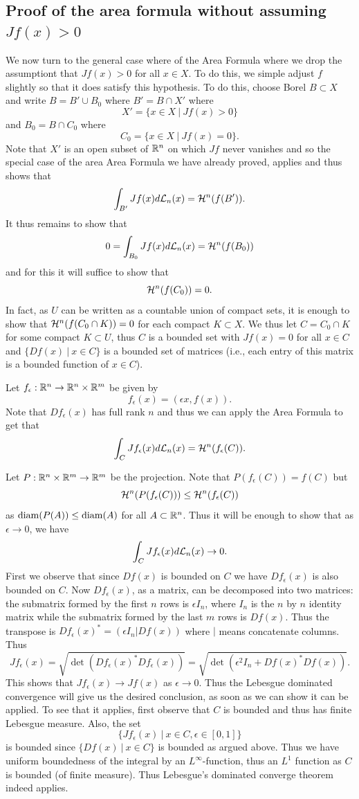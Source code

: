 \documentclass[twoside, a4paper, 10pt]{amsart}
\begin{document}
\subsection{Proof of the area formula without assuming $Jf(x)>0$} We now turn to the general case where of the Area Formula where we drop the assumptiont that $Jf(x)>0$ for all $x \in X$. To do this, we simple adjust $f$ slightly so that it does satisfy this hypothesis. To do this, choose Borel $B \subset X$ and write $B = B' \cup B_0$ where $B' = B \cap X'$ where $$X' = \{ x \in X ~|~ Jf(x) > 0 \}$$ and $B_0 = B \cap C_0$ where 
$$ C_0 = \{ x \in X ~|~ Jf(x) = 0 \}.$$ Note that $X'$ is an open subset of $\mathbb{R}^n$ on which $Jf$ never vanishes and so the special case of the area Area Formula we have already proved, applies and thus shows that $$\int_{B'} Jf(x) d\mathcal{L}_n(x) = \mathcal{H}^n(f(B')).$$ It thus remains to show that 
$$0 = \int_{B_0} Jf(x) d\mathcal{L}_n(x) = \mathcal{H}^n(f(B_0))$$ and for this it will suffice to show that $$\mathcal{H}^n(f(C_0)) = 0.$$ In fact, as $U$ can be written as a countable union of compact sets, it is enough to show that $\mathcal{H}^n(f(C_0 \cap K)) = 0$ for each compact $K \subset X$. We thus let $C = C_0 \cap K$ for some compact $K \subset U$, thus $C$ is a bounded set with $Jf(x) = 0$ for all $x \in C$ and $\{ Df(x) ~|~ x \in C\}$ is a bounded set of matrices (i.e., each entry of this matrix is a bounded function of $x \in C$).

Let $f_{\epsilon}:\mathbb{R}^n \to \mathbb{R}^n \times \mathbb{R}^m$ be given by $$f_{\epsilon}(x) = (\epsilon x, f(x)).$$ Note that $Df_{\epsilon}(x)$ has full rank $n$ and thus we can apply the Area Formula to get that
$$ \int_{C} Jf_{\epsilon}(x) d\mathcal{L}_n(x) = \mathcal{H}^n(f_{\epsilon}(C)). $$

Let $P:\mathbb{R}^n \times \mathbb{R}^m \to \mathbb{R}^m$ be the projection.
Note that $P(f_{\epsilon}(C)) = f(C)$ but $$\mathcal{H}^n(P(f_{\epsilon}(C))) \leq \mathcal{H}^n(f_{\epsilon}(C))$$ as $\operatorname{diam} (P(A)) \leq \operatorname{diam} (A)$ for all $A \subset \mathbb{R}^n$. Thus it will be enough to show that as $\epsilon \to 0$, we have $$\int_{C} Jf_{\epsilon}(x) d\mathcal{L}_n(x) \to 0. $$ First we observe that since $Df(x)$ is bounded on $C$ we have $Df_{\epsilon}(x)$  is also bounded on $C$. Now $Df_{\epsilon}(x)$, as a matrix, can be decomposed into two matrices: the submatrix formed by the first $n$ rows is $\epsilon I_n$, where $I_n$ is the $n$ by $n$ identity matrix while the submatrix formed by the last $m$ rows is $Df(x)$. Thus the transpose is $Df_{\epsilon}(x)^* = (\epsilon I_n | Df(x))$ where $|$ means concatenate columns. Thus 
$$Jf_{\epsilon}(x) = \sqrt{\det(Df_{\epsilon}(x)^*Df_{\epsilon}(x))} =  \sqrt{\det(\epsilon^2 I_n + Df(x)^*Df(x))}.$$ 
This shows that $Jf_{\epsilon}(x) \to Jf(x)$ as $\epsilon \to 0$. Thus the Lebesgue dominated convergence will give us the desired conclusion, as soon as we can show it can be applied. To see that it applies, first observe that $C$ is bounded and thus has finite Lebesgue measure. Also, the set $$\{ Jf_{\epsilon}(x) ~|~ x \in C, \epsilon \in [0,1] \}$$ is bounded since $\{Df(x) ~|~ x \in C\}$ is bounded as argued above. Thus we have uniform boundedness of the integral by an $L^{\infty}$-function, thus an $L^1$ function as $C$ is bounded (of finite measure). Thus Lebesgue's dominated converge theorem indeed applies. 
\end{document}
